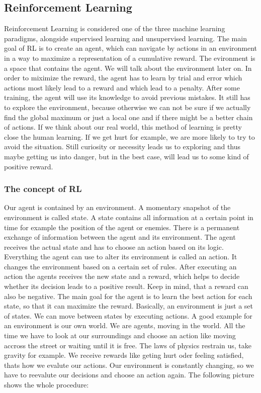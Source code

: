 \subsection{Reinforcement Learning}
	Reinforcement Learning is considered one of the three machine learning paradigms, alongside supervised learning and unsupervised learning. The main goal of RL is to create an agent, which can navigate by actions in an environment in a way to maximize a representation of a cumulative reward. The evironment is a space that contains the agent. We will talk about the environment later on. In order to miximize the reward, the agent has to learn by trial and error which actions most likely lead to a reward and which lead to a penalty. After some training, the agent will use its knowledge to avoid previous mistakes. It still has to explore the environment, because otherwise we can not be sure if we actually find the global maximum or just a local one and if there might be a better chain of actions. If we think about our real world, this method of learning is pretty close the human learning. If we get hurt for example, we are more likely to try to avoid the situation. Still curiosity or necessity leads us to exploring and thus maybe getting us into danger, but in the best case, will lead us to some kind of positive reward.\\
	
	\subsubsection{The concept of RL}
		Our agent is contained by an environment. A momentary snapshot of the environment is called state. A state contains all information at a certain point in time for example the position of the agent or enemies. There is a permanent exchange of information between the agent and its environment. The agent receives the actual state and has to choose an action based on its logic. Everything the agent can use to alter its environment is called an action. It changes the environment based on a certain set of rules. After executing an action the agents receives the new state and a reward, which helps to decide whether its decision leads to a positive result. Keep in mind, that a reward can also be negative. The main goal for the agent is to learn the best action for each state, so that it can maximize the reward. Basically, an environment is just a set of states. We can move between states by executing actions. A good example for an environment is our own world. We are agents, moving in the world. All the time we have to look at our surroundings and choose an action like moving accross the street or waiting until it is free. The laws of physics restrain us, take gravity for example. We receive rewards like geting hurt oder feeling satisfied, thats how we evalute our actions. Our environment is constantly changing, so we have to reevalute our decisions and choose an action again. The following picture shows the whole procedure:\\ 

